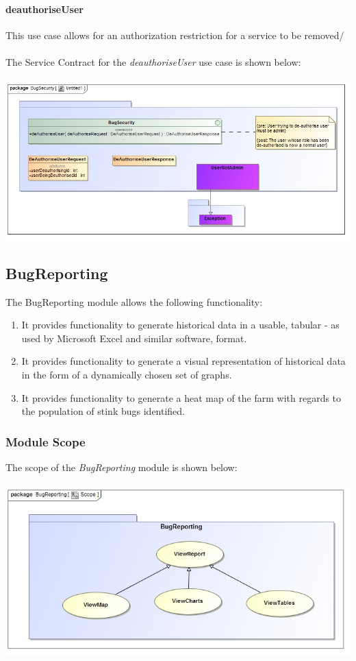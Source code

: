 \documentclass[11pt,a4paper,titlepage]{article}
\begin{document}
		\paragraph{deauthoriseUser }
				This use case allows for an authorization restriction for a service to be removed/\\\hfill\\
		The Service Contract for the \textit{deauthoriseUser} use case is shown below:\\\hfill\\
		\includegraphics[width=\linewidth]{deauthor}
		
		
		
	\subsection{BugReporting}
	The BugReporting module allows the following functionality:
	\begin{enumerate}
		\item It provides functionality to generate historical data in a usable, tabular - as used by Microsoft Excel and similar software, format.
		\item It provides functionality to generate a visual representation of historical data in the form of a dynamically chosen set of graphs.
		\item It provides functionality to generate a heat map of the farm with regards to the population of stink bugs identified.
	\end{enumerate}
		\subsubsection{Module Scope}
		The scope of the \textit{BugReporting} module is shown below:\\
		\hfill\\
			\includegraphics[width=\linewidth]{ReportingScope}
\end{document}

